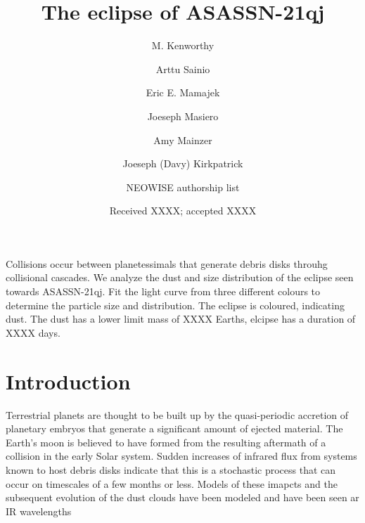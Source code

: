 \documentclass{aa}
\begin{document}
 

   \title{The eclipse of ASASSN-21qj}

   \author{M. Kenworthy
          \and
          Arttu Sainio
          \and
          Eric E. Mamajek
          \and
          Joeseph Masiero
          \and 
          Amy Mainzer
          \and
          Joeseph (Davy) Kirkpatrick
          \and 
          NEOWISE authorship list
          }


   \date{Received XXXX; accepted XXXX}

 
  \abstract
   {Collisions occur between planetessimals that generate debris disks throuhg collisional cascades.}
   {We analyze the dust and size distribution of the eclipse seen towards ASASSN-21qj.}
   {Fit the light curve from three different colours to determine the particle size and distribution.}
   {The eclipse is coloured, indicating dust.
   The dust has a lower limit mass of XXXX Earths, elcipse has a duration of XXXX days.}
   {}


   \maketitle
%

   \section{Introduction}

Terrestrial planets are thought to be built up by the quasi-periodic accretion of planetary embryos that generate a significant amount of ejected material.
%
The Earth's moon is believed to have formed from the resulting aftermath of a collision in the early Solar system.
%
Sudden increases of infrared flux from systems known to host debris disks indicate that this is a stochastic process that can occur on timescales of a few months or less.
%
Models of these imapcts and the subsequent evolution of the dust clouds have been modeled \citep{Jackson12,Jackson14} and have been seen ar IR wavelengths \citep{Su22}
\end{document}
